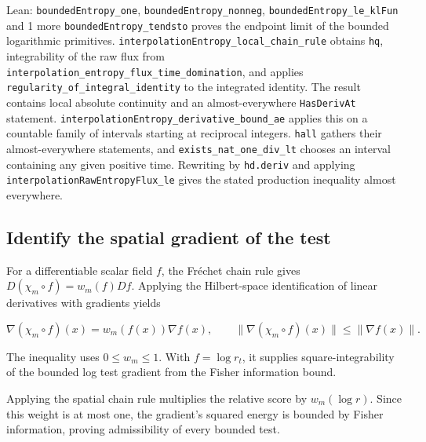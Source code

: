 \documentclass[11pt,a4paper]{report}
\begin{document}
\begin{leanbox}{Lean: \texttt{boundedEntropy\_\allowbreak{}one}, \texttt{boundedEntropy\_\allowbreak{}nonneg}, \texttt{boundedEntropy\_\allowbreak{}le\_\allowbreak{}klFun} and 1 more}
\texttt{bounded\allowbreak{}Entropy\_\allowbreak{}tendsto} proves the endpoint limit of the bounded logarithmic primitives. \texttt{interpolation\allowbreak{}Entropy\_\allowbreak{}local\_\allowbreak{}chain\_\allowbreak{}rule} obtains \texttt{hq}, integrability of the raw flux from \texttt{interpolation\_\allowbreak{}entropy\_\allowbreak{}flux\_\allowbreak{}time\_\allowbreak{}domination}, and applies \texttt{regularity\_\allowbreak{}of\_\allowbreak{}integral\_\allowbreak{}identity} to the integrated identity. The result contains local absolute continuity and an almost-everywhere \texttt{Has\allowbreak{}Deriv\allowbreak{}At} statement. \texttt{interpolation\allowbreak{}Entropy\_\allowbreak{}derivative\_\allowbreak{}bound\_\allowbreak{}ae} applies this on a countable family of intervals starting at reciprocal integers. \texttt{hall} gathers their almost-everywhere statements, and \texttt{exists\_\allowbreak{}nat\_\allowbreak{}one\_\allowbreak{}div\_\allowbreak{}lt} chooses an interval containing any given positive time. Rewriting by \texttt{hd.\allowbreak{}deriv} and applying \texttt{interpolation\allowbreak{}Raw\allowbreak{}Entropy\allowbreak{}Flux\_\allowbreak{}le} gives the stated production inequality almost everywhere.
\end{leanbox}
\subsection{\texorpdfstring{Identify the spatial gradient of the test}{Identify the spatial gradient of the test}}
\label{report-step-UnadjustedLangevin-LSI-BoundedLog-lean-5}


For a differentiable scalar field \(f\), the Fréchet chain rule gives \(D(\chi_m\circ f)=w_m(f)Df\). Applying the Hilbert-space identification of linear derivatives with gradients yields

\[\nabla(\chi_m\circ f)(x)=w_m(f(x))\nabla f(x),\qquad\|\nabla(\chi_m\circ f)(x)\|\le\|\nabla f(x)\|.\]

The inequality uses \(0\le w_m\le1\). With \(f=\log r_t\), it supplies square-integrability of the bounded log test gradient from the Fisher information bound.



Applying the spatial chain rule multiplies the relative score by \(w_m(\log r)\). Since this weight is at most one, the gradient's squared energy is bounded by Fisher information, proving admissibility of every bounded test.
\end{document}
